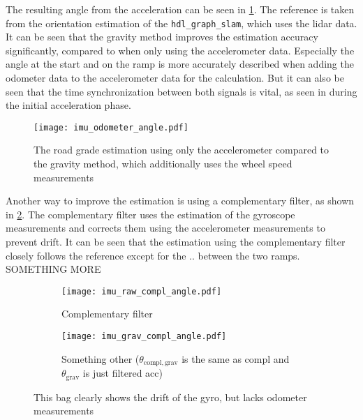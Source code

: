 The resulting angle from the acceleration can be seen in \cref{fig:imu_odometer_angle}.
The reference is taken from the orientation estimation of the \texttt{hdl\_graph\_slam}, which uses the \gls{lidar} data.
It can be seen that the gravity method improves the estimation accuracy significantly, compared to when only using the accelerometer data.
Especially the angle at the start and on the ramp is more accurately described when adding the odometer data to the accelerometer data for the calculation.
But it can also be seen that the time synchronization between both signals is vital, as seen in during the initial acceleration phase.
\begin{figure}[htbp]
	\centering
	\texttt{[image: imu\_odometer\_angle.pdf]}
	\caption[Gravity method]{The road grade estimation using only the accelerometer compared to the gravity method, which additionally uses the wheel speed measurements}
	\label{fig:imu_odometer_angle}
\end{figure}
Another way to improve the estimation is using a complementary filter, as shown in \cref{fig:imu_raw_compl_angle}.
The complementary filter uses the estimation of the gyroscope measurements and corrects them using the accelerometer measurements to prevent drift.
It can be seen that the estimation using the complementary filter closely follows the reference except for the .. between the two ramps.
SOMETHING MORE
\begin{figure}[htb]
	\centering
	\begin{subfigure}{1\textwidth}
		\centering
		\texttt{[image: imu\_raw\_compl\_angle.pdf]}
		\caption{Complementary filter}
		\label{fig:imu_raw_compl_angle}
	\end{subfigure}
	
	\begin{subfigure}{1\textwidth}
		\centering
		\texttt{[image: imu\_grav\_compl\_angle.pdf]}
		\caption{Something other ($\theta_\mathrm{compl, grav}$ is the same as compl and $\theta_\mathrm{grav}$ is just filtered acc)}
		\label{fig:imu_grav_compl_angle}
	\end{subfigure}
	\caption{This bag clearly shows the drift of the gyro, but lacks odometer measurements}
\end{figure}

